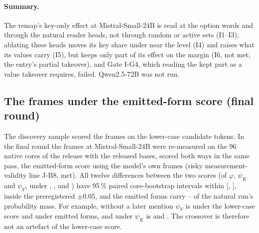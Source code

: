 \begin{table}[!ht]
\centering
\footnotesize
\caption{\textbf{The remap under each blocking at Mistral-Small-24B} (preregistration I; values as printed by the scorer). $t = D^O/D^\emptyset$; superscripts $O$ and $\emptyset$: with and without the blocking; $\kappa = K/(K+V)$ with the $\kappa$ rule (--: $\kappa$ undefined in 99\% of resamples; $\Delta_V$ not applicable or M$\to$T not printed); $\tilde\psi_K = K^O/D^\emptyset$ and $\tilde\psi_V = V^O/D^\emptyset$; $\Delta_V = V^O - V^\emptyset$, paired by core; $D$, $K$, $V$: M's effect, its key-only and its value-only part, in nats; M$\to$T: share of (core, fit) items whose top answer is M's target. A: mean-ablation of the heads' outputs at the option rows; A$^+$: with block 5; N: no attention from the option rows to the writing token. $^\dagger$Exploratory: N(all at $G$), every head at the option rows $G$; A(block 5), the 32 heads of block 5 alone; N(rand0), the first random set of 64; A($H^*_{\text{\fmtOpt{}}}$), the \fmtOpt{} set ablated under \fmtLetter{}. 95\% core-bootstrap CIs.}
\label{tab:link}
{\scriptsize\setlength{\tabcolsep}{3pt}}
\end{table}

\paragraph{Summary.} The remap's key-only effect at Mistral-Small-24B is read at the option words and through the natural reader heads, not through random or active sets (I1--I3); ablating these heads moves its key share under \fmtOpt{} near the \fmtNone{} level (I4) and raises what its values carry (I5), but keeps only part of its effect on the margin (I6, not met; the entry's partial takeover), and Gate I-G4, which reading the kept part as a value takeover requires, failed. Qwen2.5-72B was not run.

\subsection{The frames under the emitted-form score (final round)}\label{app:remap-emitted}

The discovery sample scored the frames on the lower-case candidate tokens. In the final round the frames at Mistral-Small-24B were re-measured on the 96 native cores of the release with the released bases, scored both ways in the same pass, the emitted-form score using the model's own frames (risky measurement-validity line J-B8, met). All twelve differences between the two scores (of $\varphi$, $\psi_K$ and $\psi_V$, under \fmtOpt{}, \fmtNone{}, \fmtBefore{} and \fmtPost{}) have 95\,\% paired core-bootstrap intervals within [\JbEightLoMin{}, \JbEightHiMax{}], inside the preregistered $\pm 0.05$, and the emitted forms carry \JbEightMEMin{}--\JbEightMEMax{} of the natural run's probability mass. For example, without a later mention $\psi_V$ is \JbEightPsiVLNone{} under the lower-case score and \JbEightPsiVENone{} under emitted forms, and under \fmtOpt{} $\psi_K$ is \JbEightPsiKLOpt{} and \JbEightPsiKEOpt{}. The crossover is therefore not an artefact of the lower-case score.
